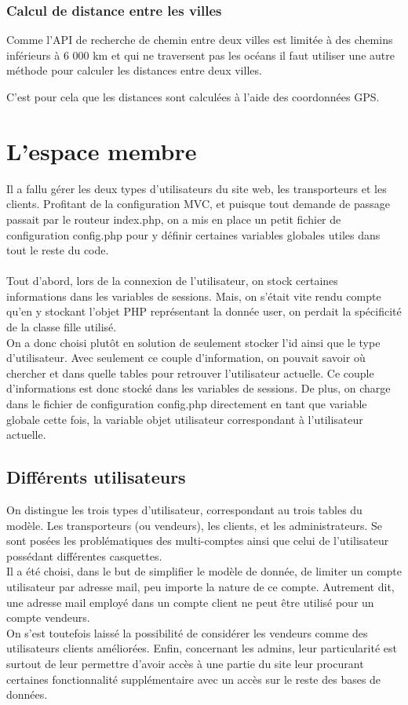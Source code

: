 \documentclass{article}
\begin{document}
        \subsubsection{Calcul de distance entre les villes}
            Comme l'API de recherche de chemin entre deux villes est limitée à des chemins inférieurs à 6 000 km et qui ne traversent pas les océans il faut utiliser une autre méthode pour calculer les distances entre deux villes.
            
            C'est pour cela que les distances sont calculées à l'aide des coordonnées GPS.
            
    \section{L'espace membre}
Il a fallu gérer les deux types d'utilisateurs du site web, les transporteurs et les clients. Profitant de la configuration MVC, et puisque tout demande de passage passait par le routeur index.php, on a mis en place un petit fichier de configuration config.php pour y définir certaines variables globales utiles dans tout le reste du code. 
\\
\\
Tout d'abord, lors de la connexion de l'utilisateur, on stock certaines informations dans les variables de sessions. Mais, on s'était vite rendu compte qu'en y stockant l'objet PHP représentant la donnée user, on perdait la spécificité de la classe fille utilisé. 
\\ 
On a donc choisi plutôt en solution de seulement stocker l'id ainsi que le type d'utilisateur. Avec seulement ce couple d'information, on pouvait savoir où chercher et dans quelle tables pour retrouver l'utilisateur actuelle. Ce couple d'informations est donc stocké dans les variables de sessions. De plus, on charge dans le fichier de configuration config.php directement en tant que variable globale cette fois, la variable objet utilisateur correspondant à l'utilisateur actuelle. 

\subsection{Différents utilisateurs} 
On distingue les trois types d'utilisateur, correspondant au trois tables du modèle. Les transporteurs (ou vendeurs), les clients, et les administrateurs.
Se sont posées les problématiques des multi-comptes ainsi que celui de l'utilisateur possédant différentes casquettes. 
\\
Il a été choisi, dans le but de simplifier le modèle de donnée, de limiter un compte utilisateur par adresse mail, peu importe la nature de ce compte. 
Autrement dit, une adresse mail employé dans un compte client ne peut être utilisé pour un compte vendeurs. 
\\
On s'est toutefois laissé la possibilité de considérer les vendeurs comme des utilisateurs clients améliorées. Enfin, concernant les admins, leur particularité est surtout de leur permettre d'avoir accès à une partie du site leur procurant certaines fonctionnalité supplémentaire avec un accès sur le reste des bases de données.
\end{document}
